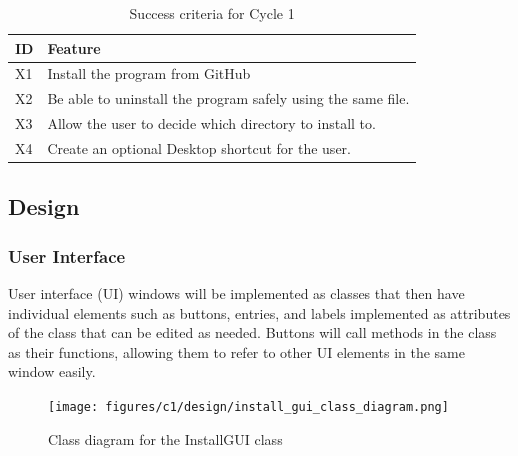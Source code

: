 \documentclass[11pt]{article}
\begin{document}
                \begin{table}[!ht]
                    \centering
                    \begin{tabular}{m{16pt}m{}}
                        ID & Feature \\ \hline
                        X1 & Install the program from GitHub \\ 
                        X2 & Be able to uninstall the program safely using the same file. \\ 
                        X3 & Allow the user to decide which directory to install to. \\ 
                        X4 & Create an optional Desktop shortcut for the user. \\ 
                    \end{tabular}
                    \caption{Success criteria for Cycle 1}
                    \label{tbl:succ_crit_c1}
                \end{table}


                
        \subsection{Design}

            \subsubsection{User Interface}
                User interface (UI) windows will be implemented as classes that then have individual elements such as buttons, entries, and labels implemented as attributes of the class that can be edited as needed. Buttons will call methods in the class as their functions, allowing them to refer to other UI elements in the same window easily.

                \begin{figure}[!ht]
                    \centering
                    \texttt{[image: figures/c1/design/install\_gui\_class\_diagram.png]}
                    \caption{Class diagram for the InstallGUI class}
                    \label{fig:install_gui_class_diagram_c1}
                \end{figure}
\end{document}
